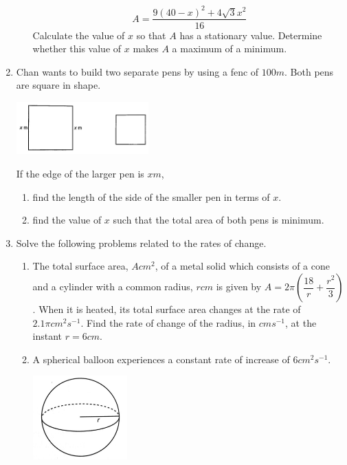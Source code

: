 \documentclass{report}
\begin{document}
\begin{multicols*}{2}
\begin{enumerate}
\begin{enumerate}
                        \[A = \dfrac{9{(40 - x)}^2 + 4\sqrt{3}x^2}{16}\]
                        Calculate the value of $x$ so that $A$ has a stationary value. Determine
                        whether this value of $x$ makes $A$ a maximum of a minimum.
              \end{enumerate}
        \item Chan wants to build two separate pens by using a fenc of $100\textit{m}$. Both
              pens are square in shape.
              \begin{center}
                  \includegraphics[width=0.4\textwidth]{./images/q30_2.jpeg}
              \end{center}
              If the edge of the larger pen is $x\textit{m}$,
              \begin{enumerate}
                  \item find the length of the side of the smaller pen in terms of $x$.
                  \item find the value of $x$ such that the total area of both pens is minimum.
              \end{enumerate}
        \item Solve the following problems related to the rates of change.
              \begin{enumerate}
                  \item The total surface area, $A\textit{cm}^2$, of a metal solid which consists of a
                        cone and a cylinder with a common radius, $r\textit{cm}$ is given by $A =
                            2\pi\left(\dfrac{18}{r} + \dfrac{r^2}{3}\right)$. When it is heated, its total
                        surface area changes at the rate of $2.1\pi \textit{cm}^2s^{-1}$. Find the rate
                        of change of the radius, in $\textit{cm} s^{-1}$, at the instant $r =
                            6\textit{cm}$.
                  \item A spherical balloon experiences a constant rate of increase of
                        $6\textit{cm}^2s^{-1}$.
                        \begin{center}
                            \includegraphics[width=0.3\textwidth]{./images/q31.jpeg}

\end{center}
\end{enumerate}
\end{enumerate}
\end{multicols*}
\end{document}
